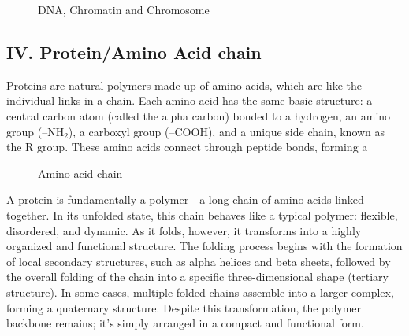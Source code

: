 \documentclass[12pt]{article}
\begin{document}
\begin{flushleft}
\begin{figure}[!ht]
  \centering
  
  \caption{DNA, Chromatin and Chromosome\cite{byjus_chromatin}}
\end{figure}



\vspace{-2em} 
\subsection*{IV. Protein/Amino Acid chain}
Proteins are natural polymers made up of amino acids, which are like the individual links in a chain. Each amino acid has the same basic structure: a central carbon atom (called the alpha carbon) bonded to a hydrogen, an amino group (–NH$_2$), a carboxyl group (–COOH), and a unique side chain, known as the R group. These amino acids connect through peptide bonds, forming a 

\begin{figure}[!ht]
  \centering
  
  \caption{Amino acid chain}
\end{figure}

A protein is fundamentally a polymer—a long chain of amino acids linked together. In its unfolded state, this chain behaves like a typical polymer: flexible, disordered, and dynamic. As it folds, however, it transforms into a highly organized and functional structure. The folding process begins with the formation of local secondary structures, such as alpha helices and beta sheets, followed by the overall folding of the chain into a specific three-dimensional shape (tertiary structure). In some cases, multiple folded chains assemble into a larger complex, forming a quaternary structure. Despite this transformation, the polymer backbone remains; it’s simply arranged in a compact and functional form.


\end{flushleft}
\end{document}
